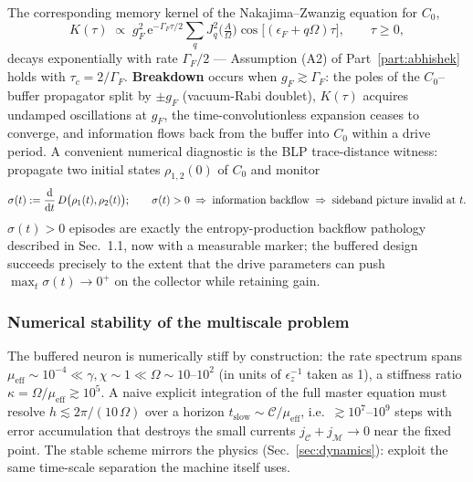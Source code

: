\documentclass[11pt,a4paper]{article}
\theoremstyle{definition}
\theoremstyle{remark}
\newcommand{\ee}{\mathrm{e}}
\begin{document}
The corresponding memory kernel of the Nakajima--Zwanzig equation for
$C_0$,
\begin{equation}
K(\tau) \;\propto\; g_F^{2}\,
\ee^{-\Gamma_F\tau/2}
\sum_q J_q^{2}\!\Big(\tfrac{A}{\Omega}\Big)
\cos\!\big[(\epsilon_F+q\Omega)\tau\big],
\qquad \tau\ge 0,
\label{eq:kernel}
\end{equation}
decays exponentially with rate $\Gamma_F/2$ --- Assumption (A2) of
Part~\ref{part:abhishek} holds with
$\tau_c = 2/\Gamma_F$. \textbf{Breakdown} occurs when
$g_F\gtrsim\Gamma_F$: the poles of the $C_0$--buffer propagator split
by $\pm g_F$ (vacuum-Rabi doublet), $K(\tau)$ acquires undamped
oscillations at $g_F$, the time-convolutionless expansion ceases to
converge, and information flows back from the buffer into $C_0$ within
a drive period. A convenient numerical diagnostic is the BLP
trace-distance witness: propagate two initial states
$\rho_{1,2}(0)$ of $C_0$ and monitor
\begin{equation}
\sigma(t) := \dv{t}\, D\big(\rho_1(t),\rho_2(t)\big);
\qquad
\sigma(t) > 0 \;\Rightarrow\; \text{information backflow}
\;\Rightarrow\; \text{sideband picture invalid at } t .
\label{eq:BLP}
\end{equation}
$\sigma(t)>0$ episodes are exactly the entropy-production
back\-flow pathology described in Sec.~1.1, now with a measurable
marker; the buffered design succeeds precisely to the extent that the
drive parameters can push $\max_t\sigma(t)\to 0^+$ on the collector
while retaining gain.
 
\subsubsection{Numerical stability of the multiscale problem}
\label{sec:numstab}
The buffered neuron is numerically stiff by construction: the rate
spectrum spans
$\mu_{\mathrm{eff}}\sim 10^{-4} \ll \gamma,\chi \sim 1 \ll
\Omega \sim 10$--$10^{2}$ (in units of $\epsilon_z^{-1}$ taken as 1),
a stiffness ratio $\kappa = \Omega/\mu_{\mathrm{eff}}\gtrsim 10^{5}$.
A naive explicit integration of the full master equation must resolve
$h \lesssim 2\pi/(10\,\Omega)$ over a horizon
$t_{\mathrm{slow}}\sim \mathcal{C}/\mu_{\mathrm{eff}}$, i.e.\
$\gtrsim 10^{7}$--$10^{9}$ steps with error accumulation that destroys
the small currents $j_\mathcal{C}+j_\mathcal{M}\to 0$ near the fixed
point. The stable scheme mirrors the physics
(Sec.~\ref{sec:dynamics}): exploit the same time-scale separation the
machine itself uses.
 
\end{document}
